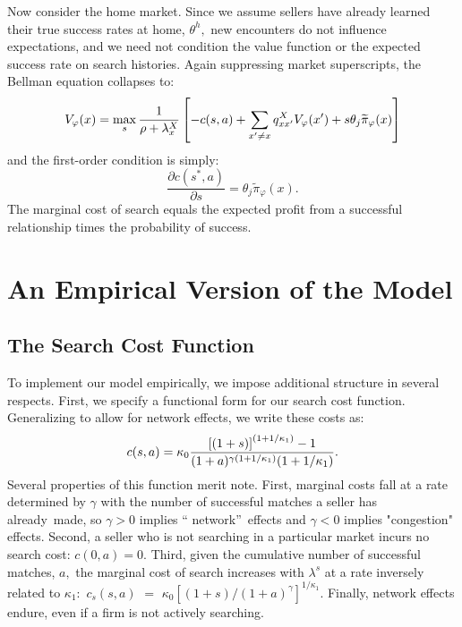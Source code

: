 Now consider the home market. Since we assume sellers have already learned
their true success rates at home, $\theta ^{h},$ new encounters do not
influence expectations, and we need not condition the value function or the
expected success rate on search histories$.$ Again suppressing market
superscripts, the Bellman equation collapses to:%
\begin{equation}
V_{\varphi }(x)=\max_{s}\frac{1}{\rho +\lambda _{x}^{X}}\left[
-c(s,a)+\sum_{x^{\prime }\neq x}q_{xx^{\prime }}^{X}V_{\varphi }(x^{\prime
})+s\theta _{j}\widetilde{\pi }_{\varphi }(x)\right]  \notag
\end{equation}%
and the first-order condition is simply:%
\begin{equation*}
\frac{\partial c(s^{\ast },a)}{\partial s}=\theta _{j}\widetilde{\pi }%
_{\varphi }(x).
\end{equation*}%
The marginal cost of search equals the expected profit from a successful
relationship times the probability of success.

\section{An Empirical Version of the Model}

\subsection{The Search Cost Function}

To implement our model empirically, we impose additional structure in
several respects. First, we specify a functional form for our search cost
function. Generalizing \citet{arkolakis2010market} to allow for network effects, we write these costs as:%
\begin{equation}
c(s,a)=\kappa _{0}\frac{\left[ (1+s)\right] ^{(1+1/\kappa _{1})}-1}{%
(1+a)^{\gamma (1+1/\kappa _{1})}(1+1/\kappa _{1})}.  \label{cost of effort}
\end{equation}%
Several properties of this function merit note. First, marginal costs fall
at a rate determined by $\gamma $ with the number of successful matches a
seller has already\ made, so $\gamma >0$ implies \textquotedblleft
network\textquotedblright\ effects and $\gamma <0$ implies "congestion"
effects.\footnotemark{}
Second, a seller who is not searching in a particular market incurs no
search cost: $c(0,a)=0.$ Third, given the cumulative number of successful
matches, $a,$ the marginal cost of search increases with $\lambda ^{s}$ at a
rate inversely related to $\kappa _{1}:$ $c_{s}(s,a)$ $=$ $\kappa _{0}\left[
(1+s)/(1+a)^{\gamma }\right] ^{1/\kappa _{1}}.$ Finally, network effects
endure, even if a firm is not actively searching.


